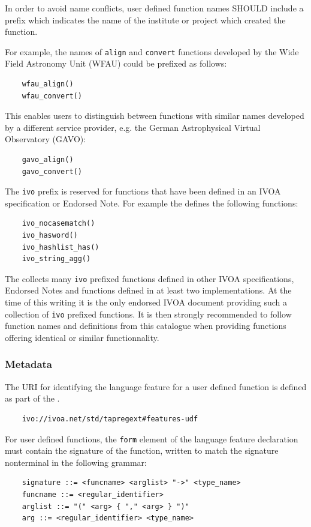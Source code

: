 \documentclass[11pt,a4paper]{ivoa}
\begin{document}
In order to avoid name conflicts, user defined function names SHOULD include
a prefix which indicates the name of the institute or project which created
the function.

For example, the names of \verb:align: and \verb:convert: functions developed
by the Wide Field Astronomy Unit (WFAU) could be prefixed as follows:
\begin{verbatim}
    wfau_align()
    wfau_convert()
\end{verbatim}

This enables users to distinguish between functions with similar names developed
by a different service provider, e.g. the German Astrophysical Virtual
Observatory (GAVO):
\begin{verbatim}
    gavo_align()
    gavo_convert()
\end{verbatim}

The \verb:ivo: prefix is reserved for functions that have been defined in an
IVOA specification or Endorsed Note. For example the \CatalogueUDF{} defines the
following functions:
\begin{verbatim}
    ivo_nocasematch()
    ivo_hasword()
    ivo_hashlist_has()
    ivo_string_agg()
\end{verbatim}

The \CatalogueUDF{} collects many \verb:ivo: prefixed functions defined in other
IVOA specifications, Endorsed Notes and functions defined in at least two
implementations. At the time of this writing it is the only endorsed IVOA
document providing such a collection of \verb:ivo: prefixed functions. It is
then strongly recommended to follow function names and definitions from this
catalogue when providing functions offering identical or similar functionnality.

\subsubsection{Metadata}
\label{sec:user.metadata}

The URI for identifying the language feature for a user defined function
is defined as part of the \TAPRegSpec{}.

\begin{verbatim}
    ivo://ivoa.net/std/tapregext#features-udf
\end{verbatim}

For user defined functions, the \verb:form: element of the language feature
declaration must contain the signature of the function, written to match
the signature nonterminal in the following grammar:
\begin{verbatim}
    signature ::= <funcname> <arglist> "->" <type_name>
    funcname ::= <regular_identifier>
    arglist ::= "(" <arg> { "," <arg> } ")"
    arg ::= <regular_identifier> <type_name>
\end{verbatim}
\end{document}
